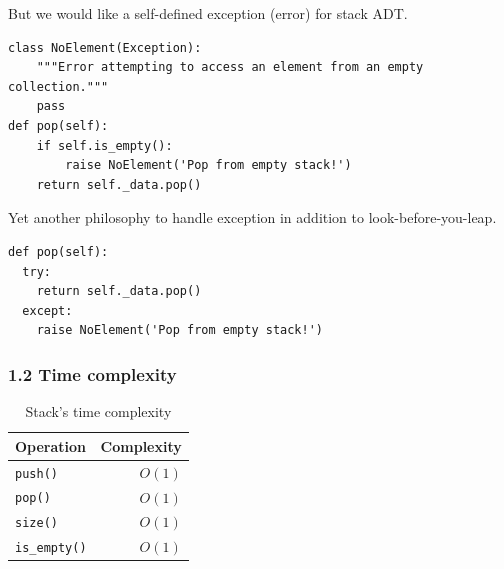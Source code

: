 \documentclass[aspectratio=169, 14pt]{beamer}
\begin{document}
\begin{frame}[fragile]
	But we would like a self-defined exception (error) for stack ADT.

	\begin{verbatim}
class NoElement(Exception):
    """Error attempting to access an element from an empty collection."""
    pass
def pop(self):
    if self.is_empty():
        raise NoElement('Pop from empty stack!')
    return self._data.pop()  
\end{verbatim}
\end{frame}

\begin{frame}[fragile]
	Yet another philosophy to handle exception in addition to \alert{look-before-you-leap}.

	\begin{verbatim}
def pop(self):
  try:
    return self._data.pop()
  except:
    raise NoElement('Pop from empty stack!')
\end{verbatim}
\end{frame}

\begin{frame}
	\frametitle{1.2 Time complexity}
	\begin{table}
		\caption{Stack's time complexity}
		\begin{tabular}{lr}
			\toprule
			Operation            & Complexity \\
			\midrule
			\texttt{push()}      & $O(1)$     \\
			\texttt{pop()}       & $O(1)$     \\
			\texttt{size()}      & $O(1)$     \\
			\texttt{is\_empty()} & $O(1)$     \\
			\bottomrule
		\end{tabular}
	\end{table}

\end{frame}
\end{document}
